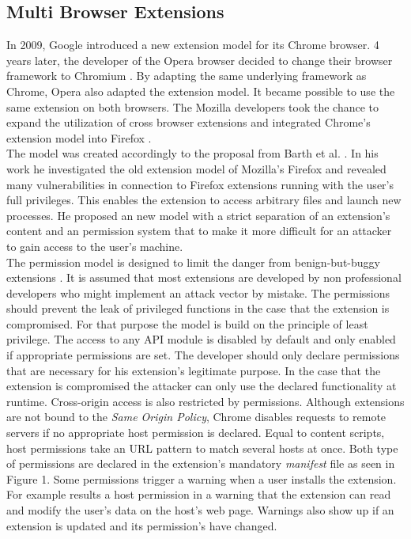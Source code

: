 \documentclass[article,colorback,accentcolor=tud9c,type=bsc]{tudthesis}
\let\stdsubsection\subsection
\renewcommand\subsection{\newpage\stdsubsection}
\begin{document}
\subsection{Multi Browser Extensions}

	In 2009, Google introduced a new extension model for its Chrome browser. 4 years later, the developer of the Opera browser decided to change their browser framework to Chromium \cite{operaBlogSwitchToChromium}. By adapting the same underlying framework as Chrome, Opera also adapted the extension model. It became possible to use the same extension on both browsers. The Mozilla developers took the chance to expand the utilization of cross browser extensions and integrated Chrome's extension model into Firefox \cite{mozillaBlogWebExtension}. \\
	The model was created accordingly to the proposal from Barth et al. \cite{Barth10protectingbrowsers}. In his work he investigated the old extension model of Mozilla's Firefox and revealed many vulnerabilities in connection to Firefox extensions running with the user's full privileges. This enables the extension to access arbitrary files and launch new processes. He proposed an new model with a strict separation of an extension's content and an permission system that to make it more difficult for an attacker to gain access to the user's machine. \\ 	
	The permission model is designed to limit the danger from benign-but-buggy extensions \cite{Barth10protectingbrowsers}. It is assumed that most extensions are developed by non professional developers who might implement an attack vector by mistake. The permissions should prevent the leak of privileged functions in the case that the extension is compromised. For that purpose the model is build on the principle of least privilege. The access to any API module is disabled by default and only enabled if appropriate permissions are set. The developer should only declare permissions that are necessary for his extension's legitimate purpose. In the case that the extension is compromised the attacker can only use the declared functionality at runtime. Cross-origin access is also restricted by permissions. Although extensions are not bound to the \textit{Same Origin Policy}, Chrome disables requests to remote servers if no appropriate host permission is declared. Equal to content scripts, host permissions take an URL pattern to match several hosts at once. Both type of permissions are declared in the extension's mandatory \textit{manifest} file as seen in Figure 1. Some permissions trigger a warning when a user installs the extension. For example results a host permission in a warning that the extension can read and modify the user's data on the host's web page. Warnings also show up if an extension is updated and its permission's have changed. \\
	
\end{document}
